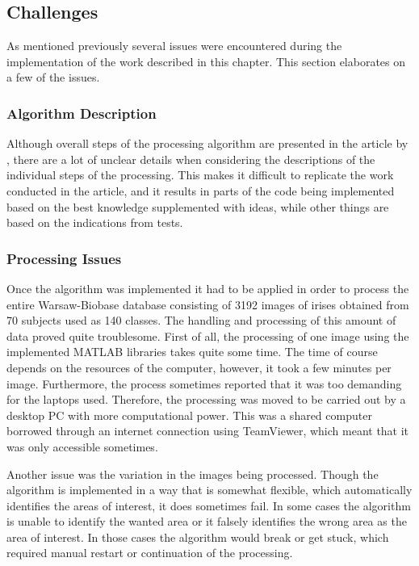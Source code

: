 \subsection{Challenges}
\label{sec:ChallDatabase}
As mentioned previously several issues were encountered during the implementation of the work described in this chapter. This section elaborates on a few of the issues. 

\subsubsection{Algorithm Description} 
Although overall steps of the processing algorithm are presented in the article by \cite{Khan2017a}, there are a lot of unclear details when considering the descriptions of the individual steps of the processing. This makes it difficult to replicate the work conducted in the article, and it results in parts of the code being implemented based on the best knowledge supplemented with ideas, while other things are based on the indications from tests.

\subsubsection{Processing Issues}
Once the algorithm was implemented it had to be applied in order to process the entire Warsaw-Biobase database consisting of 3192 images of irises obtained from 70 subjects used as 140 classes. The handling and processing of this amount of data proved quite troublesome. First of all, the processing of one image using the implemented MATLAB libraries takes quite some time. The time of course depends on the resources of the computer, however, it took a few minutes per image. Furthermore, the process sometimes reported that it was too demanding for the laptops used. Therefore, the processing was moved to be carried out by a desktop PC with more computational power. This was a shared computer borrowed through an internet connection using TeamViewer, which meant that it was only accessible sometimes. 

Another issue was the variation in the images being processed. Though the algorithm is implemented in a way that is somewhat flexible, which automatically identifies the areas of interest, it does sometimes fail. In some cases the algorithm is unable to identify the wanted area or it falsely identifies the wrong area as the area of interest. In those cases the algorithm would break or get stuck, which required manual restart or continuation of the processing. 

